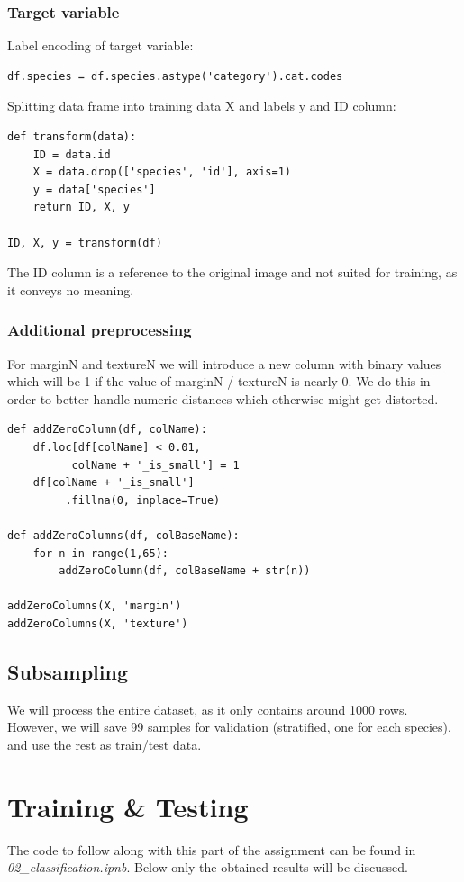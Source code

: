 \documentclass{sig-alternate-05-2015}
\begin{document}
\subsubsection{Target variable}

Label encoding of target variable:
\begin{verbatim}
df.species = df.species.astype('category').cat.codes
\end{verbatim}

Splitting data frame into training data X and labels y and ID column:
\begin{verbatim}
def transform(data):
    ID = data.id
    X = data.drop(['species', 'id'], axis=1)
    y = data['species']
    return ID, X, y

ID, X, y = transform(df)
\end{verbatim}

The ID column is a reference to the original image and not suited for training, as it conveys no meaning.

\subsubsection{Additional preprocessing}
For marginN and textureN we will introduce a new column with binary values which will be 1 if the value of marginN / textureN is nearly 0.
We do this in order to better handle numeric distances which otherwise might get distorted.

\begin{verbatim}
def addZeroColumn(df, colName):
    df.loc[df[colName] < 0.01, 
          colName + '_is_small'] = 1
    df[colName + '_is_small']
         .fillna(0, inplace=True)

def addZeroColumns(df, colBaseName):
    for n in range(1,65):
        addZeroColumn(df, colBaseName + str(n))
        
addZeroColumns(X, 'margin')
addZeroColumns(X, 'texture')
\end{verbatim}

\subsection{Subsampling}
We will process the entire dataset, as it only contains around 1000 rows.
However, we will save 99 samples for validation (stratified, one for each species), and use the rest as train/test data.

\section{Training \& Testing}
The code to follow along with this part of the assignment can be found in \emph{02\_classification.ipnb}. Below only the obtained results will be discussed.
\end{document}
